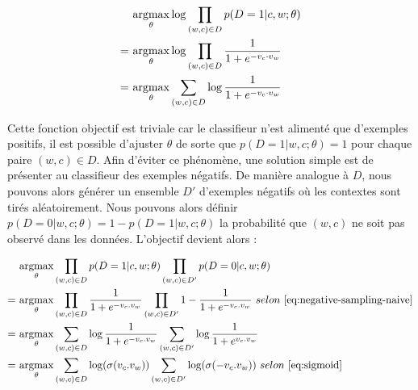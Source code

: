 \documentclass[citation\_needed]{subfiles}
\begin{document}
\begin{equation}\label{eq:negative-sampling-naive}
\begin{aligned}
  &\ \underset{\theta}{\operatorname{argmax}} \log \prod_{(w,c) \in D} p(D=1|c,w;\theta) \\
= &\ \underset{\theta}{\operatorname{argmax}} \log \prod_{(w,c) \in D} \frac{1}{1+e^{-v_c \cdot v_{w}}} \\
= &\ \underset{\theta}{\operatorname{argmax}} \sum_{(w,c) \in D} \log \frac{1}{1+e^{-v_c \cdot v_{w}}} \\
\end{aligned}
\end{equation}

Cette fonction objectif est triviale car le classifieur n'est alimenté que d'exemples positifs, il est possible d'ajuster $\theta$ de sorte que $p(D = 1|w, c;\theta)=1$ pour chaque paire $(w,c) \in D$. Afin d'éviter ce phénomène, une solution simple est de présenter au classifieur des exemples négatifs. De manière analogue à $D$, nous pouvons alors générer un ensemble $D'$ d'exemples négatifs où les contextes sont tirés aléatoirement. Nous pouvons alors définir $p(D=0|w,c;\theta) = 1 - p(D=1|w,c;\theta)$ la probabilité que $(w,c)$ ne soit pas observé dans les données. L'objectif devient alors :

\begin{equation}\label{eq:negative-sampling}
\begin{aligned}
  &\ \underset{\theta}{\operatorname{argmax}} \prod_{(w,c) \in D} p(D=1|c,w;\theta) \prod_{(w,c) \in D'} p(D=0|c,w;\theta) \\
= &\ \underset{\theta}{\operatorname{argmax}} \prod_{(w,c) \in D} \frac{1}{1 + e^{-v_{c}.v_{w}}} \prod_{(w,c) \in D'} 1 - \frac{1}{1 + e^{-v_{c}.v_{w}}}\ selon\ \ref{eq:negative-sampling-naive} \\
= &\ \underset{\theta}{\operatorname{argmax}} \sum_{(w,c) \in D} \log \frac{1}{1 + e^{-v_{c}.v_{w}}} \sum_{(w,c) \in D'} \log \frac{1}{1 + e^{v_{c}.v_{w}}} \\
= &\ \underset{\theta}{\operatorname{argmax}} \sum_{(w,c) \in D} \log(\sigma(v_{c}.v_{w})) \sum_{(w,c) \in D'} \log(\sigma(-v_{c}.v_{w}))\ selon\ \ref{eq:sigmoid}\\
\end{aligned}
\end{equation}
\end{document}

